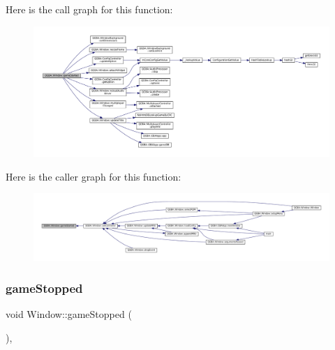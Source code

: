 Here is the call graph for this function\+:
\nopagebreak
\begin{figure}[H]
\begin{center}
\leavevmode
\includegraphics[width=350pt]{class_q_g_b_a_1_1_window_a6260cb425f1ee6f8f808eaa195a0557f_cgraph}
\end{center}
\end{figure}
Here is the caller graph for this function\+:
\nopagebreak
\begin{figure}[H]
\begin{center}
\leavevmode
\includegraphics[width=350pt]{class_q_g_b_a_1_1_window_a6260cb425f1ee6f8f808eaa195a0557f_icgraph}
\end{center}
\end{figure}
\mbox{\label{class_q_g_b_a_1_1_window_a1dc3c78cd77d281e0604f69da146f33a}} 
\subsubsection{\texorpdfstring{game\+Stopped}{gameStopped}}
{\footnotesize\ttfamily void Window\+::game\+Stopped (\begin{DoxyParamCaption}{ }\end{DoxyParamCaption})\hspace{0.3cm}{\ttfamily [private]}, {\ttfamily [slot]}}

